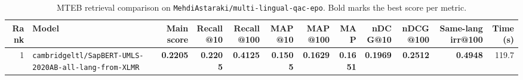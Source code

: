 \begin{table}[t]
\centering
\small
\begin{tabular}{r l r r r r r r r r r r}
\hline
Rank & Model & Main score & Recall@10 & Recall@100 & MAP@10 & MAP@100 & MAP & nDCG@10 & nDCG@100 & Same-lang irr@100 & Time (s) \\
\hline
1 & \texttt{cambridgeltl/SapBERT-UMLS-2020AB-all-lang-from-XLMR} & \textbf{0.2205} & \textbf{0.2205} & \textbf{0.4125} & \textbf{0.1505} & \textbf{0.1629} & \textbf{0.1651} & \textbf{0.1969} & \textbf{0.2512} & \textbf{0.4948} & 119.7 \\
\hline
\end{tabular}
\caption{MTEB retrieval comparison on \texttt{MehdiAstaraki/multi-lingual-qac-epo}. Bold marks the best score per metric.}
\label{tab:mteb-model-comparison}
\end{table}
